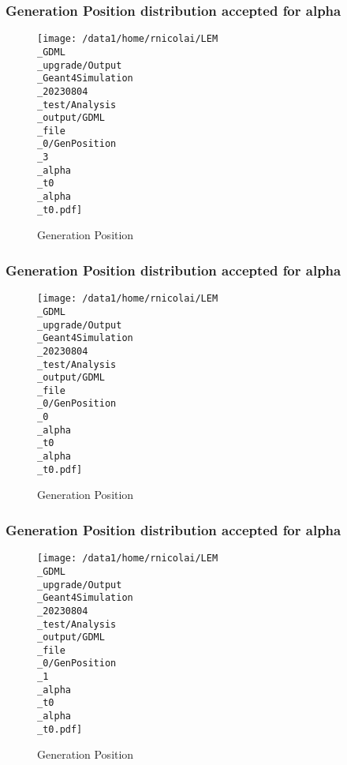 \documentclass[8pt]{beamer}
\begin{document}
            \begin{frame}
                \frametitle{Generation Position distribution accepted for alpha}
            
        \begin{figure}[h]
            \centering
            \texttt{[image: /data1/home/rnicolai/LEM\\\_GDML\\\_upgrade/Output\\\_Geant4Simulation\\\_20230804\\\_test/Analysis\\\_output/GDML\\\_file\\\_0/GenPosition\\\_3\\\_alpha\\\_t0\\\_alpha\\\_t0.pdf]}
            \caption{Generation Position}
        \end{figure}
        
            \end{frame}
            
            \begin{frame}
                \frametitle{Generation Position distribution accepted for alpha}
            
        \begin{figure}[h]
            \centering
            \texttt{[image: /data1/home/rnicolai/LEM\\\_GDML\\\_upgrade/Output\\\_Geant4Simulation\\\_20230804\\\_test/Analysis\\\_output/GDML\\\_file\\\_0/GenPosition\\\_0\\\_alpha\\\_t0\\\_alpha\\\_t0.pdf]}
            \caption{Generation Position}
        \end{figure}
        
            \end{frame}
            
            \begin{frame}
                \frametitle{Generation Position distribution accepted for alpha}
            
        \begin{figure}[h]
            \centering
            \texttt{[image: /data1/home/rnicolai/LEM\\\_GDML\\\_upgrade/Output\\\_Geant4Simulation\\\_20230804\\\_test/Analysis\\\_output/GDML\\\_file\\\_0/GenPosition\\\_1\\\_alpha\\\_t0\\\_alpha\\\_t0.pdf]}
            \caption{Generation Position}
        \end{figure}
        
            \end{frame}
            
        
\end{document}
